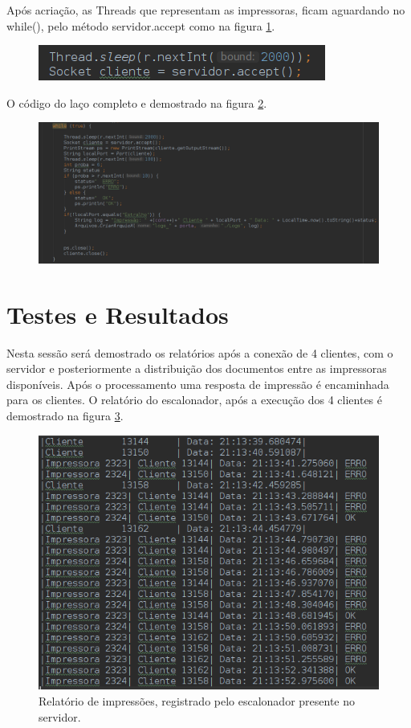 \documentclass[12pt]{article}
\begin{document}
Após acriação, as Threads que representam as impressoras, ficam aguardando no while(), pelo método servidor.accept como na figura  \ref{fig:screenshot004}.


\begin{figure}[H]
	\centering
	\includegraphics[width=0.7\linewidth]{imagens/screenshot004}
	\caption{}
	\label{fig:screenshot004}
\end{figure}
O código do laço completo e demostrado na figura \ref{fig:screenshot003}.

\begin{figure}[H]
	\centering
	\includegraphics[width=0.7\linewidth]{imagens/screenshot003}
	\caption{}
	\label{fig:screenshot003}
\end{figure}
\section{Testes e Resultados }
 Nesta sessão será demostrado os relatórios após  a conexão de 4 clientes, com o servidor e posteriormente a distribuição dos documentos entre as impressoras disponíveis. 
 Após o processamento uma resposta de impressão é encaminhada para os clientes.
 O relatório do escalonador, após a execução dos
 4 clientes é demostrado na figura \ref{fig:screenshot009}.
 \begin{figure}[H]
 	\centering
 	\includegraphics[width=0.7\linewidth]{imagens/screenshot014}
 	\caption{Relatório de impressões, registrado pelo escalonador presente no servidor.}
 	\label{fig:screenshot009}
 \end{figure}
\end{document}
